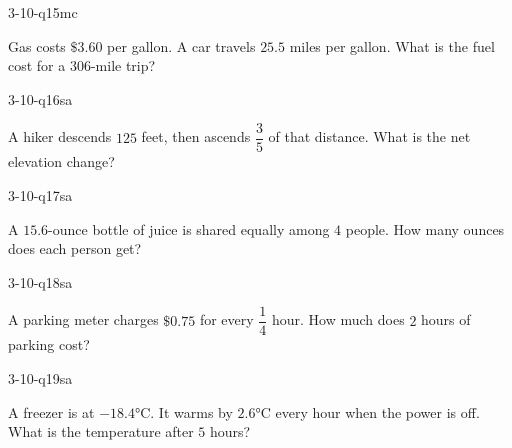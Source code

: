 \begin{practiceQuestion}{3-10-q15}{mc}
\begin{questionText}
Gas costs $\$3.60$ per gallon. A car travels $25.5$ miles per gallon. What is the fuel cost for a $306$-mile trip?
\end{questionText}
\end{practiceQuestion}


\begin{practiceQuestion}{3-10-q16}{sa}
\begin{questionText}
A hiker descends $125$ feet, then ascends $\dfrac{3}{5}$ of that distance. What is the net elevation change?
\end{questionText}
\end{practiceQuestion}

\begin{practiceQuestion}{3-10-q17}{sa}
\begin{questionText}
A $15.6$-ounce bottle of juice is shared equally among $4$ people. How many ounces does each person get?
\end{questionText}
\end{practiceQuestion}

\begin{practiceQuestion}{3-10-q18}{sa}
\begin{questionText}
A parking meter charges $\$0.75$ for every $\dfrac{1}{4}$ hour. How much does $2$ hours of parking cost?
\end{questionText}
\end{practiceQuestion}

\begin{practiceQuestion}{3-10-q19}{sa}
\begin{questionText}
A freezer is at $-18.4°$C. It warms by $2.6°$C every hour when the power is off. What is the temperature after $5$ hours?
\end{questionText}
\end{practiceQuestion}

